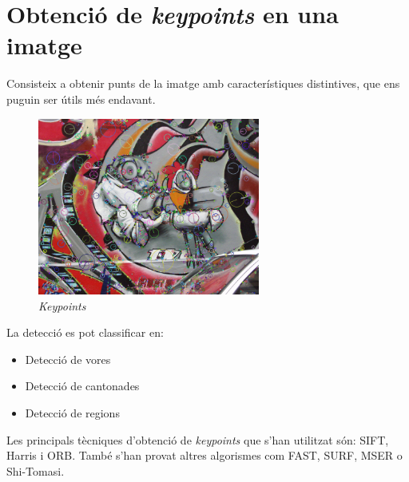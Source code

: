 \section{Obtenció de \textit{keypoints} en una imatge}
	Consisteix a obtenir punts de la imatge amb característiques distintives, que ens puguin ser útils més endavant.\\
	\begin{figure}[H]
		\centering
		\includegraphics[width=0.65\textwidth]{images/RobotKp}
		\caption{\textit{Keypoints}}
	\end{figure}
	\noindent
	La detecció es pot classificar en:\\
	\begin{itemize}
		\item{Detecció de vores}
		\item{Detecció de cantonades}
		\item{Detecció de regions\\}
	\end{itemize}
	Les principals tècniques d'obtenció de \textit{keypoints} que s'han utilitzat són: SIFT, Harris i ORB.
	També s'han provat altres algorismes com FAST\cite{Rosten:2006:MLH:2094437.2094478}, SURF, MSER\cite{BMVC.16.36:abbreviated} o Shi-Tomasi\cite{Shi:1993:GFT:866676}.

